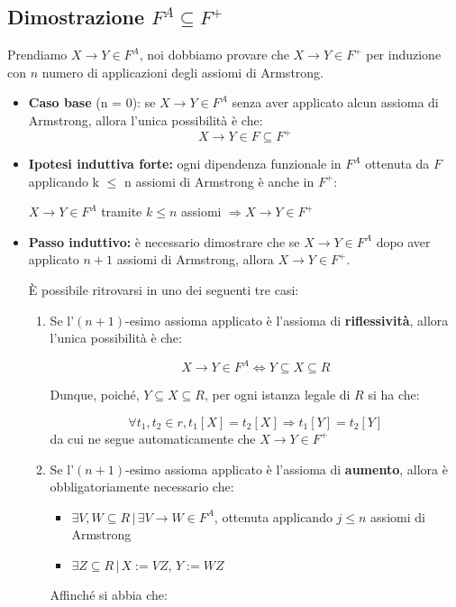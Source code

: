 \documentclass{article}
\begin{document}
\subsection{Dimostrazione $F^{A} \subseteq F^{+}$}
Prendiamo $X \rightarrow Y \in F^{A}$, noi dobbiamo provare che $X \rightarrow Y \in F^{+}$ per induzione con $n$ numero di applicazioni degli assiomi di Armstrong.
\begin{itemize}
  \item \textbf{Caso base} (n = 0): se $X \rightarrow Y \in F^{A}$ senza aver applicato alcun assioma di Armstrong, allora l'unica possibilità è che:
  \[X \rightarrow Y \in F \subseteq F^{+}\]

  \item \textbf{Ipotesi induttiva forte:} ogni dipendenza funzionale in $F^{A}$ ottenuta da $F$
  applicando k $\leq$ n assiomi di Armstrong è anche in $F^{+}$:
  \begin{center}
    $X \rightarrow Y \in F^{A}$ tramite $k \leq n$ assiomi $\Rightarrow X \rightarrow Y \in F^{+}$
  \end{center}
  \item \textbf{Passo induttivo:} è necessario dimostrare che se $X \rightarrow Y \in F^{A}$ dopo aver applicato $n +1$ assiomi di Armstrong, allora $ X \rightarrow Y \in F^{+}$.\par
  È possibile ritrovarsi in uno dei seguenti tre casi:
  \begin{enumerate}
    \item Se l'$(n + 1)$-esimo assioma applicato è l'assioma di \textbf{riflessività}, allora l'unica possibilità è che:

    \[X \rightarrow Y \in F^{A} \Leftrightarrow Y \subseteq X \subseteq R\]

    Dunque, poiché, $Y \subseteq X \subseteq R$, per ogni istanza legale di $R$ si ha che:

    \[\forall t_1, t_2 \in r, t_1[X] = t_2[X] \Rightarrow t_1[Y] = t_2[Y]\]
    da cui ne segue automaticamente che $X \rightarrow Y \in F^{+}$
    \item Se l'$(n + 1)$-esimo assioma applicato è l'assioma di \textbf{aumento}, allora è obbligatoriamente necessario che:
    \begin{itemize}
      \item $\exists V, W \subseteq R \, | \, \exists V \rightarrow W \in F^{A}$, ottenuta applicando $j \leq n$ assiomi di Armstrong\\

      \item $\exists Z \subseteq R \, | \, X := VZ, \, Y := WZ$\\
    \end{itemize}
      Affinché si abbia che:


\end{enumerate}
\end{itemize}
\end{document}
